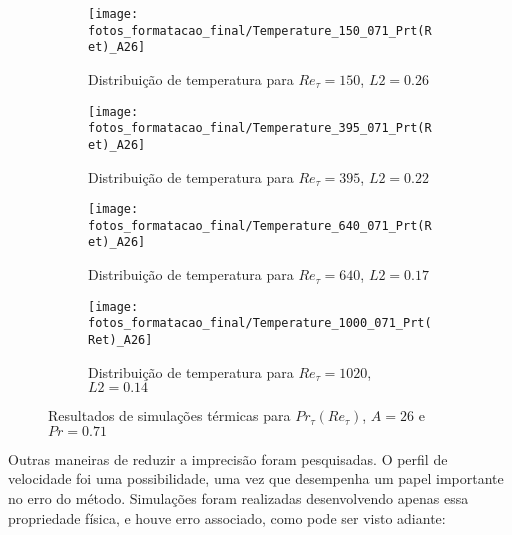 \begin{figure*}[!h]
	\centering
	\begin{subfigure}[t]{0.5\textwidth}
		\centering
		\texttt{[image: fotos\_formatacao\_final/Temperature\_150\_071\_Prt(Ret)\_A26]}
		\caption{Distribuição de temperatura para $Re_\tau = 150$, $L2 = 0.26$}
	\end{subfigure}
	\begin{subfigure}[t]{0.45\textwidth}
		\centering
		\texttt{[image: fotos\_formatacao\_final/Temperature\_395\_071\_Prt(Ret)\_A26]}
		\caption{Distribuição de temperatura para $Re_\tau = 395$, $L2 = 0.22$}
	\end{subfigure}
	\begin{subfigure}[t]{0.5\textwidth}
		\centering
		\texttt{[image: fotos\_formatacao\_final/Temperature\_640\_071\_Prt(Ret)\_A26]}
		\caption{Distribuição de temperatura para $Re_\tau = 640$, $L2 = 0.17$}
	\end{subfigure}
	\begin{subfigure}[t]{0.45\textwidth}
		\centering
		\texttt{[image: fotos\_formatacao\_final/Temperature\_1000\_071\_Prt(Ret)\_A26]}
		\caption{Distribuição de temperatura para $Re_\tau = 1020$, $L2 = 0.14$}
	\end{subfigure}	
	\caption{Resultados de simulações térmicas para $Pr_\tau(Re_\tau)$, $A = 26$ e $Pr =0.71$ }
\end{figure*}



\newpage

Outras maneiras de reduzir a imprecisão foram pesquisadas. O perfil de velocidade foi uma possibilidade, uma vez que desempenha um papel importante no erro do método. Simulações foram realizadas desenvolvendo apenas essa propriedade física, e houve erro associado, como pode ser visto adiante:

